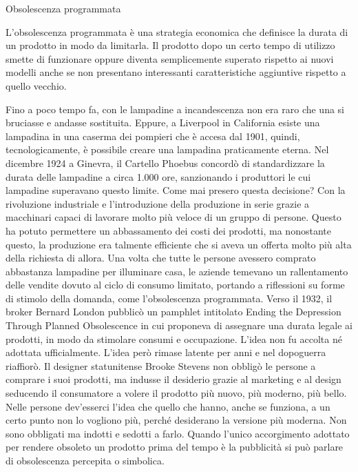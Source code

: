 \documentclass[12pt]{book} %
\begin{document}
\begin{mdframed}[linewidth=1pt]
Obsolescenza programmata

L'obsolescenza programmata è una strategia economica che definisce la durata di un prodotto in modo
da limitarla. Il prodotto dopo un certo tempo di utilizzo smette di funzionare oppure diventa semplicemente superato
rispetto ai nuovi modelli anche se non presentano interessanti caratteristiche aggiuntive rispetto a quello vecchio.

Fino a poco tempo fa, con le lampadine a incandescenza non era raro che
una si bruciasse e andasse sostituita. Eppure, a Liverpool in California esiste una lampadina in una caserma dei
pompieri che è accesa dal 1901, quindi, tecnologicamente, è possibile creare una lampadina praticamente eterna. Nel dicembre 1924 a Ginevra, il Cartello Phoebus concordò di standardizzare la durata delle lampadine a circa 1.000 ore, sanzionando i produttori le cui lampadine superavano questo limite. Come mai presero questa decisione? Con la rivoluzione industriale e
l'introduzione della produzione in serie grazie a macchinari capaci di lavorare molto più veloce
di un gruppo di persone. Questo ha potuto permettere un abbassamento dei costi dei prodotti, ma nonostante questo, la
produzione era talmente efficiente che si aveva un offerta molto più alta della richiesta di allora. 
Una volta che tutte le persone avessero comprato abbastanza lampadine per illuminare casa, le aziende temevano un rallentamento delle vendite dovuto al ciclo di consumo limitato, portando a riflessioni su forme di stimolo della domanda, come l’obsolescenza programmata. 
Verso il 1932, il broker Bernard London pubblicò un pamphlet intitolato Ending the Depression Through Planned Obsolescence in cui proponeva di assegnare una durata legale ai prodotti, in modo da stimolare consumi e occupazione. L’idea non fu accolta né adottata ufficialmente. L'idea però rimase latente per anni e nel dopoguerra riaffiorò. Il designer statunitense Brooke
Stevens non obbligò le persone a comprare i suoi prodotti, ma indusse il desiderio grazie al marketing e al design
seducendo il consumatore a volere il prodotto più nuovo, più moderno, più bello. Nelle persone
dev'esserci l'idea che quello che hanno, anche se funziona, a un certo punto
non lo vogliono più, perché desiderano la versione più moderna. Non sono obbligati ma indotti
e sedotti a farlo. Quando l'unico accorgimento adottato per rendere obsoleto un prodotto prima del tempo è la
pubblicità si può parlare di obsolescenza percepita o
simbolica.


\end{mdframed}
\end{document}
